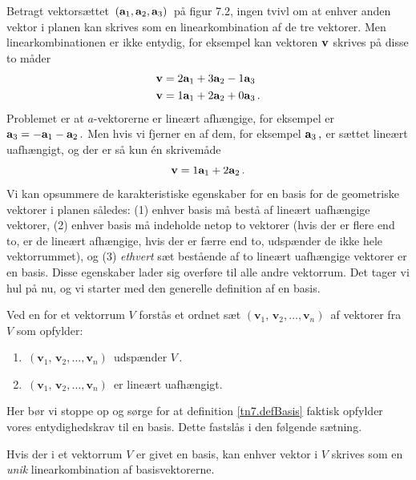 Betragt vektorsættet $\,(\mathbf{a}_1,\mathbf{a}_2,\mathbf{a}_3)\,$ på figur 7.2, ingen tvivl om at enhver anden vektor i planen kan skrives som en linearkombination af de tre vektorer. Men linearkombinationen er ikke entydig, for eksempel kan vektoren $\mathbf{v}$ skrives på disse to måder
\begin{align*}
\mathbf{v}&=2\mathbf{a}_1+3\mathbf{a}_2-1\mathbf{a}_3\\
\mathbf{v}&=1\mathbf{a}_1+2\mathbf{a}_2+0\mathbf{a}_3\,.
\end{align*}
Problemet er at $a$-vektorerne er lineært afhængige, for eksempel er $\mathbf{a}_3=-\mathbf{a}_1-\mathbf{a}_2\,.$ Men hvis vi fjerner en af dem, for eksempel $\mathbf{a}_3\,,$ er sættet lineært uafhængigt, og der er så kun én skrivemåde
$$
\mathbf{v}=1\mathbf{a}_1+2\mathbf{a}_2\,.
$$
Vi kan opsummere de karakteristiske egenskaber for en basis for de geometriske vektorer i planen således: (1) enhver basis må bestå af lineært uafhængige vektorer, (2) enhver basis må indeholde netop to vektorer (hvis der er flere end to, er de lineært afhængige, hvis der er færre end to, udspænder de ikke hele vektorrummet), og (3) \textit{ethvert} sæt bestående af to lineært uafhængige vektorer er en basis. Disse egenskaber lader sig overføre til alle andre vektorrum. Det tager vi hul på nu, og vi starter med den generelle definition af en basis.

\begin{definition}[Basis]\label{tn7.defBasis}
Ved en  for et vektorrum $V$ forstås et ordnet sæt $({\mathbf v}_1,\,{\mathbf v}_2,\ldots,{\mathbf v}_n)\,$ af vektorer fra $V$ som opfylder: 
\begin{enumerate}
\item
$\,({\mathbf v}_1,\,{\mathbf v}_2,\ldots,{\mathbf v}_n)\,$ udspænder $V\,$.
\item
$\,({\mathbf v}_1,\,{\mathbf v}_2,\ldots,{\mathbf v}_n)\,$ er lineært uafhængigt.
\end{enumerate}
\end{definition}

Her bør vi stoppe op og sørge for at definition \ref{tn7.defBasis} faktisk opfylder vores entydighedskrav til en basis. Dette fastslås i den følgende sætning.

\begin{theorem}[Entydighedssætningen]\label{tn7.unik}
Hvis der i et vektorrum $V$ er givet en basis, kan enhver vektor i $V$ skrives som en \textit{unik} linearkombination af basisvektorerne.
\end{theorem}

